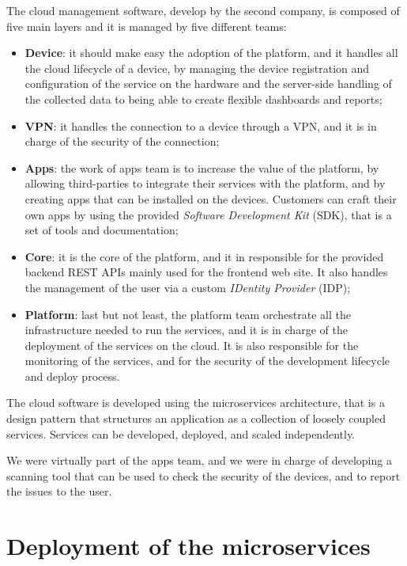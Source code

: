 The cloud management software, develop by the second company, is composed of five main layers and it is managed by five different teams:
\begin{itemize}
  \item \textbf{Device}: it should make easy the adoption of the platform, and it handles all the cloud lifecycle of a device, by managing the device registration and configuration of the service on the hardware and the server-side handling of the collected data to being able to create flexible dashboards and reports;
  \item \textbf{VPN}: it handles the connection to a device through a VPN, and it is in charge of the security of the connection;
  \item \textbf{Apps}: the work of apps team is to increase the value of the platform, by allowing third-parties to integrate their services with the platform, and by creating apps that can be installed on the devices. Customers can craft their own apps by using the provided \textit{Software Development Kit} (SDK), that is a set of tools and documentation;
  \item \textbf{Core}: it is the core of the platform, and it in responsible for the provided backend REST APIs mainly used for the frontend web site. It also handles the management of the user via a custom \textit{IDentity Provider} (IDP);
  \item \textbf{Platform}: last but not least, the platform team orchestrate all the infrastructure needed to run the services, and it is in charge of the deployment of the services on the cloud. It is also responsible for the monitoring of the services, and for the security of the development lifecycle and deploy process.
\end{itemize}

The cloud software is developed using the microservices architecture, that is a design pattern that structures an application as a collection of loosely coupled services. Services can be developed, deployed, and scaled independently.

We were virtually part of the apps team, and we were in charge of developing a scanning tool that can be used to check the security of the devices, and to report the issues to the user.

\section{Deployment of the microservices}

